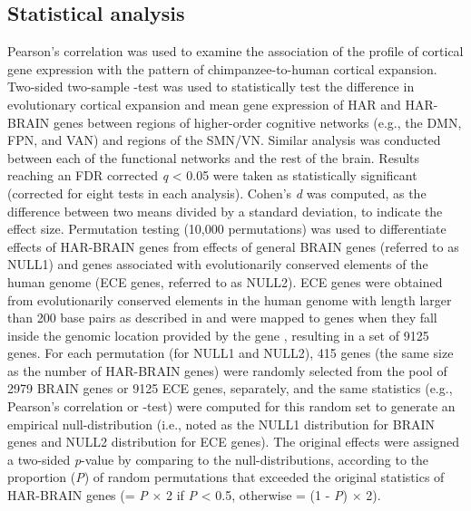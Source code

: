 \begin{refsection}
\subsection*{Statistical analysis}
Pearson's correlation was used to examine the association of the profile of cortical gene expression with the pattern of chimpanzee-to-human cortical expansion. Two-sided two-sample \tvaldf-test was used to statistically test the difference in evolutionary cortical expansion and mean gene expression of HAR and HAR-BRAIN genes between regions of higher-order cognitive networks (e.g., the DMN, FPN, and VAN) and regions of the SMN/VN. Similar analysis was conducted between each of the functional networks and the rest of the brain. Results reaching an FDR corrected \textit{q} < 0.05 were taken as statistically significant (corrected for eight tests in each analysis). Cohen's \textit{d} was computed, as the difference between two means divided by a standard deviation, to indicate the effect size. Permutation testing (10,000 permutations) was used to differentiate effects of HAR-BRAIN genes from effects of general BRAIN genes (referred to as NULL1) and genes associated with evolutionarily conserved elements of the human genome (ECE genes, referred to as NULL2). ECE genes were obtained from evolutionarily conserved elements in the human genome with length larger than 200 base pairs as described in \citep{lindblad2011high} and were mapped to genes when they fall inside the genomic location provided by the gene \citep{de2015magma}, resulting in a set of 9125 genes. For each permutation (for NULL1 and NULL2), 415 genes (the same size as the number of HAR-BRAIN genes) were randomly selected from the pool of 2979 BRAIN genes or 9125 ECE genes, separately, and the same statistics (e.g., Pearson's correlation or \tvaldf-test) were computed for this random set to generate an empirical null-distribution (i.e., noted as the NULL1 distribution for BRAIN genes and NULL2 distribution for ECE genes). The original effects were assigned a two-sided \textit{p}-value by comparing to the null-distributions, according to the proportion (\textit{P}) of random permutations that exceeded the original statistics of HAR-BRAIN genes (\pval = \textit{P} $\times$ 2 if \textit{P} < 0.5, otherwise \pval = (1 - \textit{P}) $\times$ 2).

\printbibliography[heading=subbibliography]
\end{refsection}

